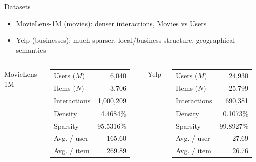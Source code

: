\documentclass[aspectratio=169,11pt]{beamer}
\begin{document}
\begin{frame}{Datasets}
\begin{block}
  
\begin{itemize}
  \item MovieLens-1M (movies): denser interactions, Movies vs Users
  \item Yelp (businesses): much sparser, local/business structure, geographical semantics
\end{itemize}

\end{block}
\medgap

\begin{columns}[T,onlytextwidth]
\centering
\small MovieLens-1M 
\medskip

\scriptsize
\begin{tabular}{lr}
\toprule
Users ($M$) & 6{,}040 \\
Items ($N$) & 3{,}706 \\
Interactions & 1{,}000{,}209 \\
Density & 4.4684\% \\
Sparsity & 95.5316\% \\
Avg. / user & 165.60 \\
Avg. / item & 269.89 \\
\bottomrule
\end{tabular}

\centering
\small Yelp 
\medskip

\scriptsize
\begin{tabular}{lr}
\toprule
Users ($M$) & 24{,}930 \\
Items ($N$) & 25{,}799 \\
Interactions & 690{,}381 \\
Density & 0.1073\% \\
Sparsity & 99.8927\% \\
Avg. / user & 27.69 \\
Avg. / item & 26.76 \\
\bottomrule
\end{tabular}
\end{columns}



\end{frame}
\end{document}
